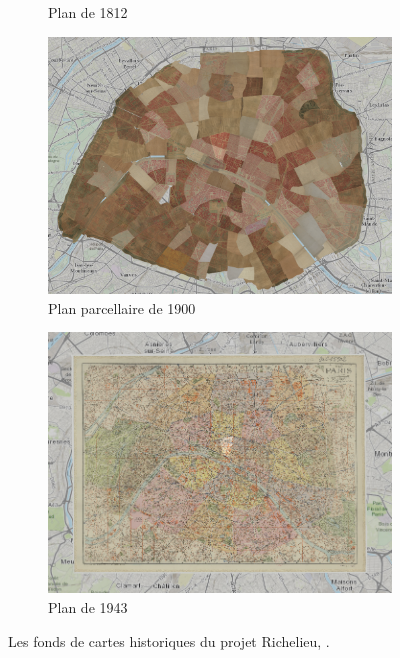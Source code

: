 \begin{figure}
\begin{subfigure}{.5\textwidth}
      \caption{Plan de 1812}
      \label{fig:1812}
    \end{subfigure}
    \begin{subfigure}{.5\textwidth}
      \centering
      \includegraphics[width=.9\linewidth]{images/plan-parcellaire.png}
      \caption{Plan parcellaire de 1900}
      \label{fig:zoom-16}
    \end{subfigure}
    \begin{subfigure}{.5\textwidth}
      \centering
      \includegraphics[width=.9\linewidth]{images/plan-1943.png}
      \caption{Plan de 1943}
      \label{fig:1943}
    \end{subfigure}
\caption{Les fonds de cartes historiques du projet Richelieu, \mhd.}
\label{fig:carto-histo}
\end{figure}